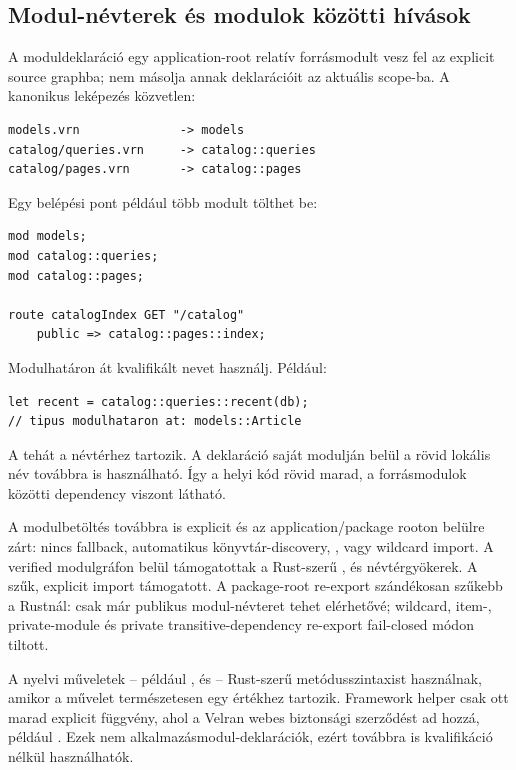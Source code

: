 \subsection*{Modul-névterek és modulok közötti hívások}

A moduldeklaráció egy application-root relatív forrásmodult vesz fel az explicit source graphba; nem másolja annak deklarációit az aktuális scope-ba. A kanonikus leképezés közvetlen:

\begin{lstlisting}
models.vrn              -> models
catalog/queries.vrn     -> catalog::queries
catalog/pages.vrn       -> catalog::pages
\end{lstlisting}

Egy belépési pont például több modult tölthet be:

\begin{lstlisting}[language=Velran]
mod models;
mod catalog::queries;
mod catalog::pages;

route catalogIndex GET "/catalog"
    public => catalog::pages::index;
\end{lstlisting}

Modulhatáron át kvalifikált nevet használj. Például:

\begin{lstlisting}[language=Velran]
let recent = catalog::queries::recent(db);
// tipus modulhataron at: models::Article
\end{lstlisting}

A  tehát a  névtérhez tartozik. A deklaráció saját modulján belül a rövid lokális név továbbra is használható. Így a helyi kód rövid marad, a forrásmodulok közötti dependency viszont látható.

A modulbetöltés továbbra is explicit és az application/package rooton belülre zárt: nincs  fallback, automatikus könyvtár-discovery, ,  vagy wildcard import. A verified modulgráfon belül támogatottak a Rust-szerű ,  és  névtérgyökerek. A szűk, explicit  import támogatott. A package-root re-export szándékosan szűkebb a Rustnál:  csak már publikus modul-névteret tehet elérhetővé; wildcard, item-, private-module és private transitive-dependency re-export fail-closed módon tiltott.

A nyelvi műveletek -- például ,  és  -- Rust-szerű metódusszintaxist használnak, amikor a művelet természetesen egy értékhez tartozik. Framework helper csak ott marad explicit függvény, ahol a Velran webes biztonsági szerződést ad hozzá, például . Ezek nem alkalmazásmodul-deklarációk, ezért továbbra is kvalifikáció nélkül használhatók.


